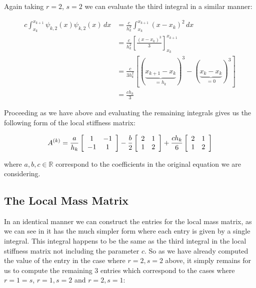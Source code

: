 Again taking $r=2$, $s=2$ we can evaluate the third integral in a similar manner:

\begin{align*}
    c\int_{x_k}^{x_{k+1}}\psi_{k,2}(x)\psi_{k,2}(x)\, dx
       &= \frac{c}{h_k^2}\int_{x_k}^{x_{k + 1}}(x - x_k)^2\, dx \\
       &= \frac{c}{h_k^2}\left[ \frac{(x - x_k)^3}{3} \right]_{x_k}^{x_{k+1}} \\
       &= \frac{c}{3h_k^2}\left[ (\underbrace{x_{k+1} - x_k}_{= h_k})^3
                            -(\underbrace{x_k - x_k}_{=0})^3\right] \\
       &= \frac{ch_k}{3}
\end{align*}

Proceeding as we have above and evaluating the remaining integrals gives us the
following form of the local stiffness matrix:


\begin{equation}\label{eq:oned-determinisitic-local-stiffness}
    A^{(k)} = \frac{a}{h_k}\left[\begin{array}{c c}
                1 & -1 \\ -1 & 1
              \end{array}\right]
              -\frac{b}{2}\left[\begin{array}{c c}
                2 & 1\\ 1 & 2
              \end{array}\right]
              + \frac{ch_k}{6}\left[\begin{array}{c c}
                2 & 1 \\ 1 & 2
              \end{array}\right]
\end{equation}

where $a,b,c \in \mathbb{R}$ correspond to the coefficients in the original
equation  we are considering.

\subsection{The Local Mass Matrix}\label{sec:oned-deterministic-local-mass}

In an identical manner we can construct the entries for the local mass matrix,
as we can see in  it has the much
simpler form where each entry is given by a single integral. This integral
happens to be the same as the third integral in the local stiffness matrix not
including the parameter $c$. So as we have already computed  the value of the
entry in the case where $r = 2, s = 2$ above, it simply remains for us to
compute the remaining 3 entries which correspond to the cases where $r = 1 =
s$, $r = 1, s = 2$ and $r = 2, s = 1$:

